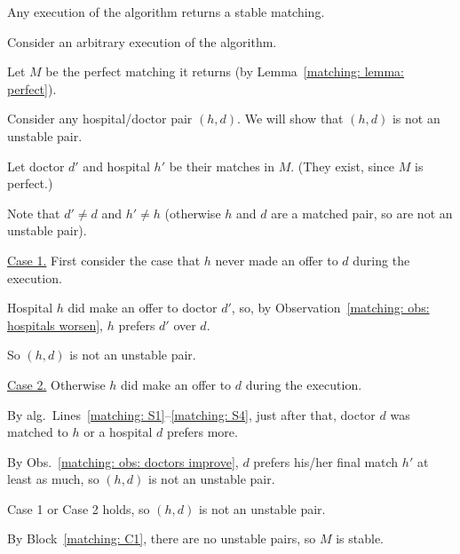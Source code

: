 \documentclass[11pt]{article}
\begin{document}
\begin{lemma}[correctness; \KT p.\,8 (1.6)]\label{matching: lemma: correctness}
  Any execution of the algorithm returns a stable matching.
\end{lemma}
\begin{longFormProof}

  \step Consider an arbitrary execution of the algorithm.

  \step Let $M$ be the perfect matching it returns (by Lemma~\ref{matching: lemma: perfect}).

  \begin{block}[matching: C1]
    \step Consider any hospital/doctor pair $(h, d)$.  We will show that $(h, d)$ is not an unstable pair.

    \step Let doctor $d'$ and hospital $h'$ be their matches in $M$.  (They exist, since $M$ is perfect.)

    \step Note that $d'\ne d$ and $h'\ne h$ (otherwise $h$ and $d$ are a matched pair, so are not an unstable pair).

    \begin{block}[matching: C11]

      \step \underline{Case 1.}
      First consider the case that $h$ never made an offer to $d$ during the execution.
      
      \step Hospital $h$ did make an offer to doctor $d'$,
      so, by Observation~\ref{matching: obs: hospitals worsen},
      $h$ prefers $d'$ over $d$.

      \step So $(h, d)$ is not an unstable pair.
    \end{block}

    \begin{block}[matching: C12]

      \step \underline{Case 2.}
      Otherwise $h$ did make an offer to $d$ during the execution.

      \step By alg.~Lines~\ref{matching: S1}--\ref{matching: S4}, just after that,
      doctor $d$ was matched to $h$ or a hospital $d$ prefers more.
      
      \step By Obs.~\ref{matching: obs: doctors improve}, $d$ prefers his/her final match $h'$ at least as much,
       so $(h, d)$ is not an unstable pair.
    \end{block}
    
    \step Case 1 or Case 2 holds, so $(h, d)$ is not an unstable pair.
  \end{block}

  \step By Block~\ref{matching: C1}, there are no unstable pairs, so $M$ is stable.
\end{longFormProof}
\end{document}
